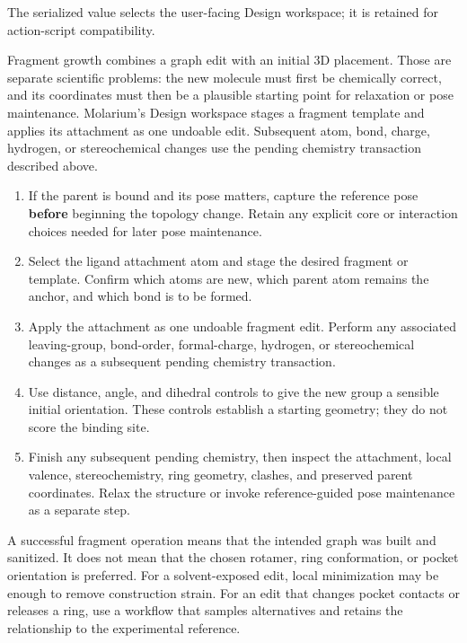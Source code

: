 \documentclass[11pt]{article}
\begin{document}
The serialized value  selects the user-facing Design workspace; it is retained for action-script compatibility.


Fragment growth combines a graph edit with an initial 3D placement. Those are separate scientific problems: the new molecule must first be chemically correct, and its coordinates must then be a plausible starting point for relaxation or pose maintenance. Molarium's Design workspace stages a fragment template and applies its attachment as one undoable edit. Subsequent atom, bond, charge, hydrogen, or stereochemical changes use the pending chemistry transaction described above.


\begin{enumerate}
\item If the parent is bound and its pose matters, capture the reference pose \textbf{before} beginning the topology change. Retain any explicit core or interaction choices needed for later pose maintenance.
\item Select the ligand attachment atom and stage the desired fragment or template. Confirm which atoms are new, which parent atom remains the anchor, and which bond is to be formed.
\item Apply the attachment as one undoable fragment edit. Perform any associated leaving-group, bond-order, formal-charge, hydrogen, or stereochemical changes as a subsequent pending chemistry transaction.
\item Use distance, angle, and dihedral controls to give the new group a sensible initial orientation. These controls establish a starting geometry; they do not score the binding site.
\item Finish any subsequent pending chemistry, then inspect the attachment, local valence, stereochemistry, ring geometry, clashes, and preserved parent coordinates. Relax the structure or invoke reference-guided pose maintenance as a separate step.
\end{enumerate}


A successful fragment operation means that the intended graph was built and sanitized. It does not mean that the chosen rotamer, ring conformation, or pocket orientation is preferred. For a solvent-exposed edit, local minimization may be enough to remove construction strain. For an edit that changes pocket contacts or releases a ring, use a workflow that samples alternatives and retains the relationship to the experimental reference.
\end{document}
